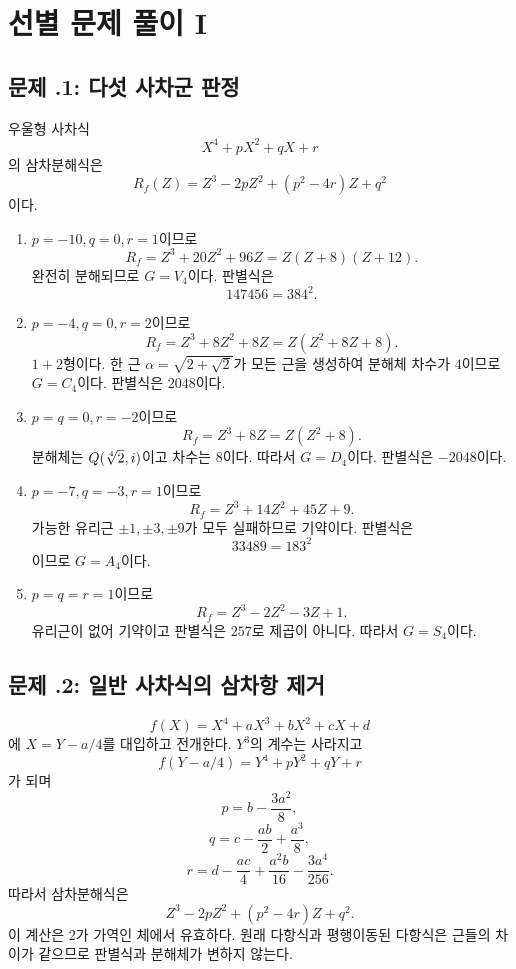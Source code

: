 \clearpage
\section{선별 문제 풀이 I}
\label{sec:quartic-quintic-solutions-a}

\subsection*{문제 \thechapter.1: 다섯 사차군 판정}

\begin{solution}
우울형 사차식
\[
  X^4+pX^2+qX+r
\]
의 삼차분해식은
\[
  R_f(Z)=Z^3-2pZ^2+(p^2-4r)Z+q^2
\]
이다.

\begin{enumerate}[label=(\alph*)]
  \item $p=-10,q=0,r=1$이므로
  \[
    R_f=Z^3+20Z^2+96Z=Z(Z+8)(Z+12).
  \]
  완전히 분해되므로 $G=V_4$이다. 판별식은
  \[
    147456=384^2.
  \]

  \item $p=-4,q=0,r=2$이므로
  \[
    R_f=Z^3+8Z^2+8Z=Z(Z^2+8Z+8).
  \]
  $1+2$형이다. 한 근 $\alpha=\sqrt{2+\sqrt2}$가 모든 근을 생성하여 분해체 차수가 $4$이므로 $G=C_4$이다. 판별식은 $2048$이다.

  \item $p=q=0,r=-2$이므로
  \[
    R_f=Z^3+8Z=Z(Z^2+8).
  \]
  분해체는 $Q(\sqrt[4]2,i)$이고 차수는 $8$이다. 따라서 $G=D_4$이다. 판별식은 $-2048$이다.

  \item $p=-7,q=-3,r=1$이므로
  \[
    R_f=Z^3+14Z^2+45Z+9.
  \]
  가능한 유리근 $\pm1,\pm3,\pm9$가 모두 실패하므로 기약이다. 판별식은
  \[
    33489=183^2
  \]
  이므로 $G=A_4$이다.

  \item $p=q=r=1$이므로
  \[
    R_f=Z^3-2Z^2-3Z+1.
  \]
  유리근이 없어 기약이고 판별식은 $257$로 제곱이 아니다. 따라서 $G=S_4$이다.
\end{enumerate}
\end{solution}

\subsection*{문제 \thechapter.2: 일반 사차식의 삼차항 제거}

\begin{solution}
\[
  f(X)=X^4+aX^3+bX^2+cX+d
\]
에 $X=Y-a/4$를 대입하고 전개한다. $Y^3$의 계수는 사라지고
\[
  f(Y-a/4)=Y^4+pY^2+qY+r
\]
가 되며
\[
  p=b-\frac{3a^2}{8},
\]
\[
  q=c-\frac{ab}{2}+\frac{a^3}{8},
\]
\[
  r=d-\frac{ac}{4}+\frac{a^2b}{16}-\frac{3a^4}{256}.
\]
따라서 삼차분해식은
\[
  Z^3-2pZ^2+(p^2-4r)Z+q^2.
\]
이 계산은 $2$가 가역인 체에서 유효하다. 원래 다항식과 평행이동된 다항식은 근들의 차이가 같으므로 판별식과 분해체가 변하지 않는다.
\end{solution}

